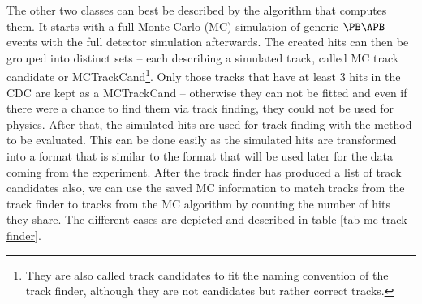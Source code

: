 The other two classes can best be described by the algorithm that computes them. It starts with a full Monte Carlo (MC) simulation of generic $\PB\APB$ events with the full detector simulation afterwards. The created hits can then be grouped into distinct sets -- each describing a simulated track, called MC track candidate or MCTrackCand\footnote{They are also called track candidates to fit the naming convention of the track finder, although they are not candidates but rather correct tracks.}. Only those tracks that have at least 3 hits in the CDC are kept as a MCTrackCand -- otherwise they can not be fitted and even if there were a chance to find them via track finding, they could not be used for physics. After that, the simulated hits are used for track finding with the method to be evaluated. This can be done easily as the simulated hits are transformed into a format that is similar to the format that will be used later for the data coming from the experiment. After the track finder has produced a list of track candidates also, we can use the saved MC information to match tracks from the track finder to tracks from the MC algorithm by counting the number of hits they share. The different cases are depicted and described in table \ref{tab-mc-track-finder}.

